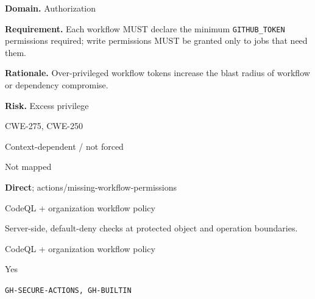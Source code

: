 \documentclass[10pt,letterpaper]{article}
\newcommand{\code}[1]{\texttt{\small #1}}
\newcommand{\prioritybadge}[2]{\tcbox[on line,boxrule=0pt,arc=1.2mm,boxsep=0.7mm,left=1mm,right=1mm,top=0.4mm,bottom=0.4mm,colback=#2!12,coltext=#2]{\scriptsize\bfseries #1}}
\begin{document}
\begin{rulebox}[title={\texttt{SCS-ACTIONS-AUTHZ-001} \hfill \prioritybadge{Critical Control}{Critical}}]
\textbf{Domain.} Authorization

\textbf{Requirement.} Each workflow MUST declare the minimum \code{GITHUB\_TOKEN} permissions required; write permissions MUST be granted only to jobs that need them.

\textbf{Rationale.} Over-privileged workflow tokens increase the blast radius of workflow or dependency compromise.

\textbf{Risk.} Excess privilege

\begin{description}[leftmargin=2.65cm,labelwidth=2.3cm,style=nextline,itemsep=1pt,topsep=3pt]
  \item[CWE] CWE-275, CWE-250
  \item[OWASP] Context-dependent / not forced
  \item[CERT] Not mapped
  \item[CodeQL] \textbf{Direct}; actions/missing-workflow-permissions
  \item[Enforcement] CodeQL + organization workflow policy
  \item[Prevention] Server-side, default-deny checks at protected object and operation boundaries.
  \item[Verification] CodeQL + organization workflow policy
  \item[Automation] Yes
  \item[Sources] \texttt{GH-SECURE-ACTIONS, GH-BUILTIN}
\end{description}
\end{rulebox}
\end{document}
